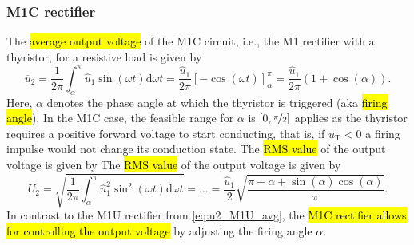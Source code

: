 \begin{frame}
    \frametitle{M1C rectifier}
    The \hl{average output voltage} of the M1C circuit, i.e., the M1 rectifier with a thyristor, for a resistive load is given by
    \begin{equation}
        \overline{u}_2 = \frac{1}{2\pi} \int_{\alpha}^{\pi} \hat{u}_1 \sin(\omega t) \mathrm{d} \omega t = \frac{\hat{u}_1}{2\pi} \left[ -\cos(\omega t) \right]_{\alpha}^{\pi} = \frac{\hat{u}_1}{2\pi} \left( 1 + \cos(\alpha) \right). 
    \end{equation}
    Here, $\alpha$ denotes the phase angle at which the thyristor is triggered (aka \hl{firing angle}). In the M1C case, the feasible range for $\alpha$ is $[0,\nicefrac{\pi}{2}]$ applies as the thyristor requires a positive forward voltage to start conducting, that is, if $u_\mathrm{T}<0$ a firing impulse would not change its conduction state. The \hl{RMS value} of the output voltage is given by
    The \hl{RMS value} of the output voltage is given by
    \begin{equation}
        U_2 = \sqrt{\frac{1}{2\pi} \int_{\alpha}^{\pi} \hat{u}_1^2 \sin^2(\omega t) \mathrm{d} \omega t} =   \ldots = \frac{\hat{u}_1}{2} \sqrt{\frac{\pi - \alpha + \sin(\alpha)\cos(\alpha)}{\pi}}.
    \end{equation}
    In contrast to the M1U rectifier from \eqref{eq:u2_M1U_avg}, the \hl{M1C rectifier allows for controlling the output voltage} by adjusting the firing angle $\alpha$.
\end{frame}

